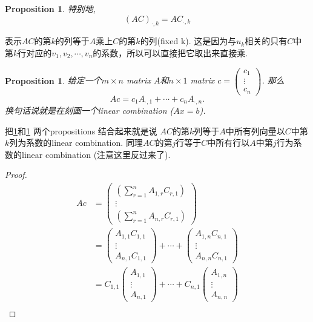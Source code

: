\documentclass{article}
\newtheorem{proposition}[theorem]{Proposition}
\begin{document}
\begin{proposition} \label{matrix: one-column-1}
特别地,
$$
(AC)_{\cdot,k}=AC_{\cdot,k}
$$
\end{proposition}
表示$AC$的第$k$的列等于$A$乘上$C$的第$k$的列(fixed k). {\color{blue} 这是因为与$u_k$相关的只有$C$中第$k$行对应的$v_1,v_2,\cdots,v_n$的系数，所以可以直接把它取出来直接乘}.

\begin{proposition} \label{matrix: one-column-2}
\rm 给定一个$m \times n$ matrix $A$和$n \times 1$ matrix $c = \begin{pmatrix} c_1 \\ \vdots \\ c_n \end{pmatrix}$. 那么
$$
Ac = c_1A_{\cdot,1} + \cdots + c_nA_{\cdot,n}.
$$
换句话说就是在刻画一个linear combination ($Ax = b$).
\end{proposition}

把\ref{matrix: one-column-1}和\ref{matrix: one-column-2} 两个propositions 结合起来就是说{\color{red} $AC$的第$k$列等于$A$中所有列向量以$C$中第$k$列为系数的linear combination}. {\color{blue}同理$AC$的第$j$行等于$C$中所有行以$A$中第$j$行为系数的linear combination (注意这里反过来了)}.

\begin{proof}
$$
\begin{aligned}
Ac &=  
\begin{pmatrix}
\left(\sum\limits_{r=1}^{n}A_{1,r}C_{r,1}\right)  \\
\vdots \\
\left(\sum\limits_{r=1}^{n}A_{n,r}C_{r,1}\right)  
\end{pmatrix} \\
&= 
\begin{pmatrix}
A_{1,1}C_{1,1} \\
\vdots \\
A_{n,1}C_{1,1} 
\end{pmatrix} + \cdots +
\begin{pmatrix}
A_{1,n}C_{n,1} \\
\vdots \\
A_{n,n}C_{n,1} 
\end{pmatrix}\\ 
&= 
C_{1,1}\begin{pmatrix}
A_{1,1} \\
\vdots \\
A_{n,1} 
\end{pmatrix} + \cdots +
C_{n,1}\begin{pmatrix}
A_{1,n} \\
\vdots \\
A_{n,n} 
\end{pmatrix}\\
\end{aligned}
$$
\end{proof}
\end{document}
